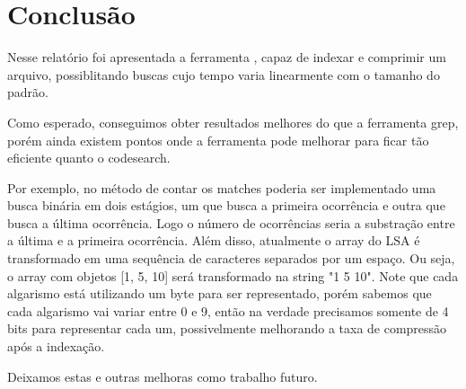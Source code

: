 \section{Conclusão}

Nesse relatório foi apresentada a ferramenta \ipmt, capaz de indexar e comprimir
um arquivo, possiblitando buscas cujo tempo varia linearmente com o tamanho do
padrão.

Como esperado, conseguimos obter resultados melhores do que a ferramenta
grep, porém ainda existem pontos onde a ferramenta pode melhorar para ficar tão
eficiente quanto o codesearch.

Por exemplo, no método de contar os matches
poderia ser implementado uma busca binária em dois estágios, um que busca a
primeira ocorrência e outra que busca a última ocorrência. Logo o número de
ocorrências seria a substração entre a última e a primeira ocorrência.
Além disso, atualmente o array do LSA é transformado em uma sequência de
caracteres separados por um espaço. Ou seja, o array com objetos [1, 5, 10] será
transformado na string "1 5 10". Note que cada algarismo está utilizando um byte
para ser representado, porém sabemos que cada algarismo vai variar entre 0 e 9,
então na verdade precisamos somente de 4 bits para representar cada um,
possivelmente melhorando a taxa de compressão após a indexação.

Deixamos estas e outras melhoras como trabalho futuro.
